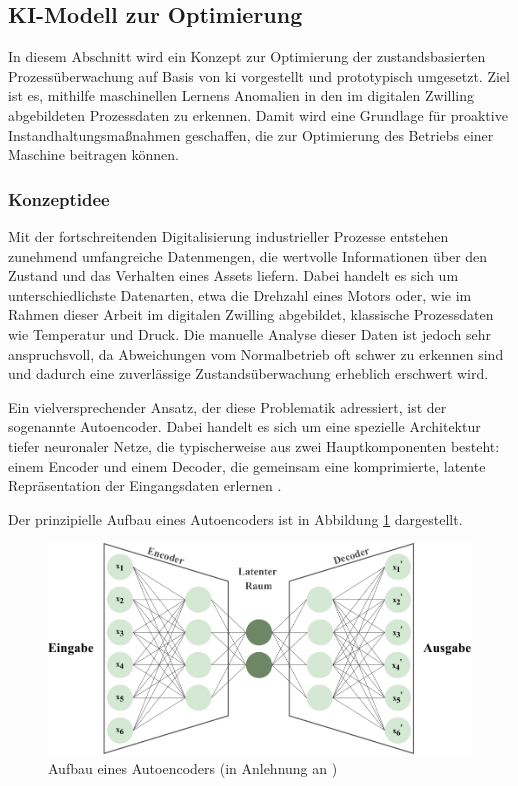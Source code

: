 \newpage
\subsection{KI-Modell zur Optimierung}
In diesem Abschnitt wird ein Konzept zur Optimierung der zustandsbasierten Prozessüberwachung auf Basis von \acs{ki} vorgestellt und prototypisch umgesetzt.
Ziel ist es, mithilfe maschinellen Lernens Anomalien in den im digitalen Zwilling abgebildeten Prozessdaten zu erkennen.
Damit wird eine Grundlage für proaktive Instandhaltungsmaßnahmen geschaffen, die zur Optimierung des Betriebs einer Maschine beitragen können.

\subsubsection{Konzeptidee}

Mit der fortschreitenden Digitalisierung industrieller Prozesse entstehen zunehmend umfangreiche Datenmengen, die wertvolle Informationen über den Zustand und das Verhalten eines Assets liefern. 
Dabei handelt es sich um unterschiedlichste Datenarten, etwa die Drehzahl eines Motors oder, wie im Rahmen dieser Arbeit im digitalen Zwilling abgebildet, klassische Prozessdaten wie Temperatur und Druck.
Die manuelle Analyse dieser Daten ist jedoch sehr anspruchsvoll, da Abweichungen vom Normalbetrieb oft schwer zu erkennen sind und dadurch eine zuverlässige Zustandsüberwachung erheblich erschwert wird.

Ein vielversprechender Ansatz, der diese Problematik adressiert, ist der sogenannte \mbox{Autoencoder}. 
Dabei handelt es sich um eine spezielle Architektur tiefer neuronaler Netze, die typischerweise aus zwei Hauptkomponenten besteht: einem Encoder und einem \mbox{Decoder}, die gemeinsam eine komprimierte, latente Repräsentation der Eingangsdaten erlernen \cite{Lempitsky2019}.

Der prinzipielle Aufbau eines Autoencoders ist in Abbildung \ref{fig:Autoencoder} dargestellt.

\vspace{0.5em}
\begin{figure}[htbp]
    \centering
    \includegraphics[width=1\textwidth]{Bilder/Autoencoder/AutoencoderModell.pdf}
    \caption[Aufbau eines Autoencoders]{Aufbau eines Autoencoders (in Anlehnung an \cite{AutoencoderBild})}
    \label{fig:Autoencoder}
\end{figure}

